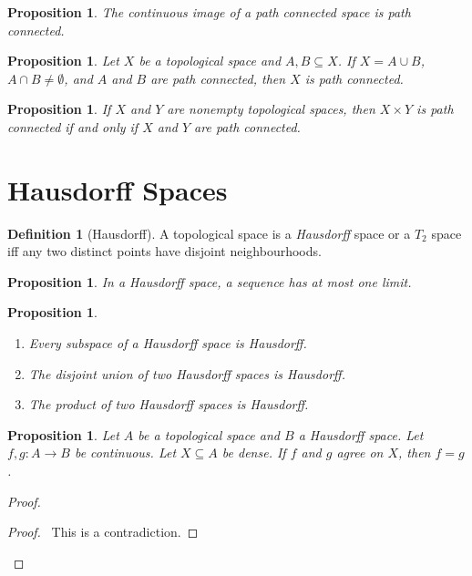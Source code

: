\documentclass{book}
\let\qed\relax
\newtheorem{prop}[ax]{Proposition}
\theoremstyle{definition}
\newtheorem{df}[ax]{Definition}
\newcommand{\inv}[1]{\ensuremath{{#1}^{-1}}}
\begin{document}
\begin{prop}
The continuous image of a path connected space is path connected.
\end{prop}

\begin{prop}
Let $X$ be a topological space and $A,B \subseteq X$. If $X = A \cup B$, $A \cap B \neq \emptyset$, and $A$ and $B$ are path connected, then $X$ is path connected.
\end{prop}

\begin{prop}
If $X$ and $Y$ are nonempty topological spaces, then
$X \times Y$ is path connected if and only if $X$ and $Y$ are path connected.
\end{prop}

\section{Hausdorff Spaces}

\begin{df}[Hausdorff]
A topological space is a \emph{Hausdorff} space or a \emph{$T_2$} space iff any two distinct points have disjoint neighbourhoods.
\end{df}

\begin{prop}
In a Hausdorff space, a sequence has at most one limit.
\end{prop}

\begin{prop}
\begin{enumerate}
\item Every subspace of a Hausdorff space is Hausdorff.
\item The disjoint union of two Hausdorff spaces is Hausdorff.
\item The product of two Hausdorff spaces is Hausdorff.
\end{enumerate}
\end{prop}

\begin{prop}
Let $A$ be a topological space and $B$ a Hausdorff space. Let $f,g : A \rightarrow B$ be continuous. Let $X \subseteq A$ be dense. If $f$ and $g$ agree on $X$, then $f = g$.
\end{prop}

\begin{proof}
\pf
{}
\step{3}{\pick\ $x \in \inv{f}(U) \cap \inv{g}(V)$}
\qedstep
\begin{proof}
\pf\ This is a contradiction.
\end{proof}
\qed
\end{proof}
\end{document}
